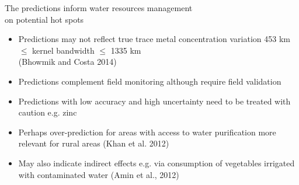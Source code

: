 \documentclass[10pt, compress]{beamer}
\begin{document}
\begin{frame}{The predictions inform water resources management \protect\\ on potential hot spots}
      \begin{itemize}
        \item \alert{Predictions may not reflect true trace metal concentration variation} 453 km $\leq$ kernel bandwidth $\leq$ 1335 km \\ (Bhowmik and Costa 2014)
        \pause
        \item \alert{Predictions complement field monitoring} although require field validation
        \pause
        \item \alert{Predictions with low accuracy and high uncertainty need to be treated with caution} e.g. zinc
        \pause
        \item \alert{Perhaps over-prediction for areas with access to water purification} more relevant for rural areas (Khan et al. 2012)
        \pause
        \item \alert{May also indicate indirect effects} e.g. via consumption of vegetables irrigated with contaminated water (Amin et al., 2012)
      \end{itemize}
\end{frame}

\end{document}
